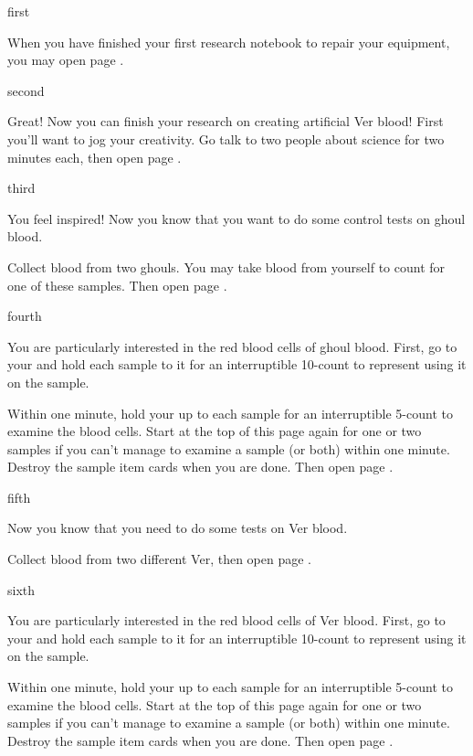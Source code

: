 \documentclass[greennotebook]{guildcamp4} %
\begin{document}
\startnotebook{\nJamesVerBlood{}}

\begin{page}{first}

When you have finished your first research notebook to repair your equipment, you may open page .

\end{page}

\begin{page}{second}

Great! Now you can finish your research on creating artificial Ver blood! First you'll want to jog your creativity. Go talk to two people about science for two minutes each, then open page .

\end{page}

\begin{page}{third}

You feel inspired! Now you know that you want to do some control tests on ghoul blood.

Collect blood from two ghouls. You may take blood from yourself to count for one of these samples. Then open page .

\end{page}

\begin{page}{fourth}

You are particularly interested in the red blood cells of ghoul blood. First, go to your \sCentrifuge{} and hold each sample to it for an interruptible 10-count to represent using it on the sample.

Within one minute, hold your \iMicroscope{} up to each sample for an interruptible 5-count to examine the blood cells. Start  at the top of this page again for one or two samples if you can't manage to examine a sample (or both) within one minute. Destroy the sample item cards when you are done. Then open page .

\end{page}

\begin{page}{fifth}

Now you know that you need to do some tests on Ver blood.

Collect blood from two different Ver, then open page .

\end{page}

\begin{page}{sixth}

You are particularly interested in the red blood cells of Ver blood. First, go to your \sCentrifuge{} and hold each sample to it for an interruptible 10-count to represent using it on the sample.

Within one minute, hold your \iMicroscope{} up to each sample for an interruptible 5-count to examine the blood cells. Start  at the top of this page again for one or two samples if you can't manage to examine a sample (or both) within one minute. Destroy the sample item cards when you are done. Then open page .

\end{page}
\end{document}
